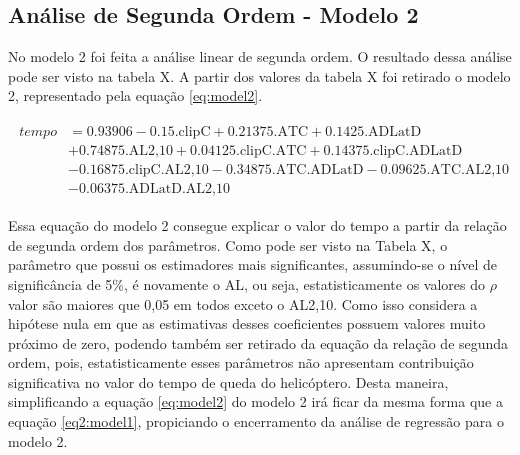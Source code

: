 
\subsection{Análise de Segunda Ordem - Modelo 2}

No modelo 2 foi feita a análise linear de segunda ordem. O resultado dessa análise pode ser visto na tabela X. A partir dos valores da tabela X foi retirado o modelo 2, representado pela equação \ref{eq:model2}.


\begin{align}
    \begin{split}
    tempo &= 0.93906 - 0.15\text{.clipC} + 0.21375\text{.ATC} + 0.1425\text{.ADLatD}  \\
    & + 0.74875\text{.AL2,10} + 0.04125\text{.clipC.ATC} + 0.14375\text{.clipC.ADLatD} \\
    & - 0.16875\text{.clipC.AL2,10} - 0.34875\text{.ATC.ADLatD} - 0.09625\text{.ATC.AL2,10} \\
    & - 0.06375\text{.ADLatD.AL2,10}
    \end{split}
\label{eq:model2}
\end{align}

Essa equação do modelo 2 consegue explicar o valor do tempo a partir da relação de segunda ordem dos parâmetros. Como pode ser visto na Tabela X, o parâmetro que possui os estimadores mais significantes, assumindo-se o nível de significância de 5\%, é novamente o AL, ou seja, estatisticamente os valores do $\rho$ valor são maiores que 0,05 em todos exceto o AL2,10. Como isso considera a hipótese nula em que as estimativas desses coeficientes possuem valores muito próximo de zero, podendo também ser retirado da equação da relação de segunda ordem, pois, estatisticamente esses parâmetros não apresentam contribuição significativa no valor do tempo de queda do helicóptero. Desta maneira, simplificando a equação \ref{eq:model2} do modelo 2 irá ficar da mesma forma que a equação \ref{eq2:model1}, propiciando o encerramento da análise de regressão para o modelo 2.